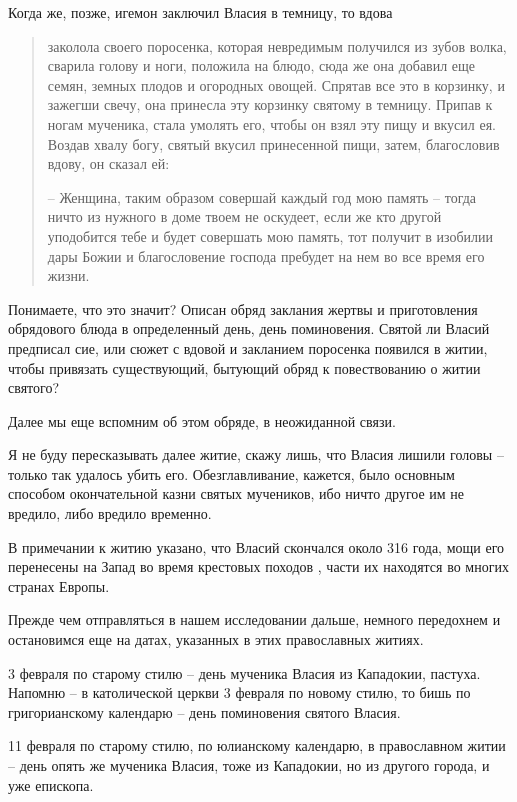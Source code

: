 \documentclass[a5paper,11pt,openany]{article}
\begin{document}
Когда же, позже, игемон заключил Власия в темницу, то вдова

\begin{quotation}
\noindent заколола своего поросенка, которая невредимым получился из зубов волка, сварила голову и ноги, положила на блюдо, сюда же она добавил еще семян, земных плодов и огородных овощей. Спрятав все это в корзинку, и зажегши свечу, она принесла эту корзинку святому в темницу. Припав к ногам мученика, стала умолять его, чтобы он взял эту пищу и вкусил ея. Воздав хвалу богу, святый вкусил принесенной пищи, затем, благословив вдову, он сказал ей:

 – Женщина, таким образом совершай каждый год мою память – тогда ничто из нужного в доме твоем не оскудеет, если же кто другой уподобится тебе и будет совершать мою память, тот получит в изобилии дары Божии и благословение господа пребудет на нем во все время его жизни.
\end{quotation}

 Понимаете, что это значит? Описан обряд заклания жертвы и приготовления обрядового блюда в определенный день, день поминовения. Святой ли Власий предписал сие, или сюжет с вдовой и закланием поросенка появился в житии, чтобы привязать существующий, бытующий обряд к повествованию о житии святого?

   Далее мы еще вспомним об этом обряде, в неожиданной связи.

 Я не буду пересказывать далее житие, скажу лишь, что Власия лишили головы – только так удалось убить его. Обезглавливание, кажется, было основным способом окончательной казни святых мучеников, ибо ничто другое им не вредило, либо вредило временно.

   В примечании к житию указано, что Власий скончался около 316 года, мощи его перенесены на Запад во время крестовых походов , части их находятся во многих странах Европы.

   Прежде чем отправляться в нашем исследовании дальше, немного передохнем и остановимся еще на датах, указанных в этих православных житиях.

   3 февраля по старому стилю – день мученика Власия из Кападокии, пастуха. Напомню – в католической церкви 3 февраля по новому стилю, то бишь по григорианскому календарю – день поминовения святого Власия.

  11 февраля по старому стилю, по юлианскому календарю, в православном житии – день опять же мученика Власия, тоже из Кападокии, но из другого города, и уже епископа.
\end{document}
